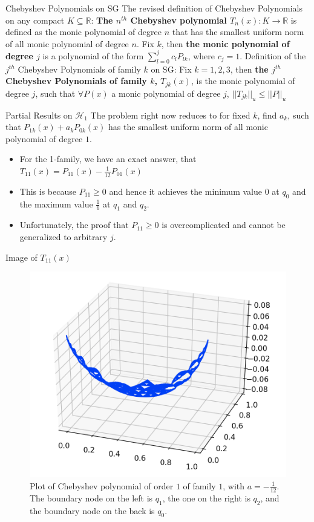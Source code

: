 \documentclass[xcolor = dvipsnames]{beamer}
\begin{document}
\begin{frame}{Chebyshev Polynomials on SG}
    \pause
    The revised definition of Chebyshev Polynomials on any compact $K \subseteq \mathbb{R}$: \newline
    \textbf{The $n^{th}$ Chebyshev polynomial $T_{n}(x): K \rightarrow \mathbb{R}$} is defined as the monic polynomial of degree $n$ that has the smallest uniform norm of all monic polynomial of degree $n$. \newline \newline
    \pause
    Fix $k$, then \textbf{the monic polynomial of degree $j$} is a polynomial of the form
    $\sum_{l=0}^{j}c_{l}P_{lk}$, where $c_{j} = 1$. \newline \newline
    \pause
    Definition of the $j^{th}$ Chebyshev Polynomials of family $k$ on SG: \newline
    Fix $k = 1,2,3$, then \textbf{the $j^{th}$ Chebyshev Polynomials of family $k$, $T_{jk}(x)$}, is the monic polynomial of degree $j$, such that $\forall P(x)$ a monic polynomial of degree $j$, $||T_{jk}||_{u} \leq ||P||_{u}$
\end{frame}

\begin{frame}{Partial Results on $\mathcal{H}_1$}
    \pause
    The problem right now reduces to for fixed $k$, find $a_{k}$, such that $P_{1k}(x)+a_{k}P_{0k}(x)$ has the smallest uniform norm of all monic polynomial of degree $1$. \newline \newline
   \begin{itemize}
        \item For the 1-family, we have an exact answer, that $T_{11}(x) = P_{11}(x)-\frac{1}{12}P_{01}(x)$
        \item This is because $P_{11} \geq 0$ and hence it achieves the minimum value $0$ at $q_{0}$ and the maximum value $\frac{1}{6}$ at $q_{1}$ and $q_{2}$.
        \item Unfortunately, the proof that $P_{11} \geq 0$ is overcomplicated and cannot be generalized to arbitrary $j$.
   \end{itemize}
\end{frame}

\begin{frame}{Image of $T_{11}(x)$}
    \begin{figure}[H]
    \centering
    \includegraphics[width=.4\textwidth]{images/chebyshev_p11_0_0833.png}
    \caption{Plot of Chebyshev polynomial of order $1$ of family $1$, with $a=-\frac{1}{12}$. The boundary node on the left is $q_{1}$, the one on the right is $q_{2}$, and the boundary node on the back is 
    $q_{0}$.}
    \end{figure}
\end{frame}
\end{document}
